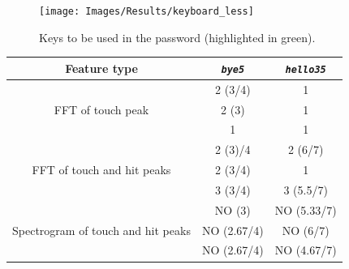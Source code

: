\begin{figure}[h]
     \centering
	 \texttt{[image: Images/Results/keyboard\_less]}
     \caption{\footnotesize{Keys to be used in the password (highlighted in green).}}\label{Results:keyboard}
\end{figure}
\begin{table}[h]
\centering\footnotesize
\begin{tabular}{ccc}
\hline
{\textbf{Feature type}}&{\texttt{\textit{bye5}}}&{\texttt{\textit{hello35}}}\\
\hline
\multirow{3}{*}{FFT of touch peak} & {2 (3/4)} & {1}\\
& {2 (3)} & {1}\\
& {1} & {1}\\
\hline
\multirow{3}{*}{FFT of touch and hit peaks} & {2 (3)/4} & {2 (6/7)}\\
& {2 (3/4)} & {1}\\
& {3 (3/4)} & {3 (5.5/7)}\\
\hline
\multirow{3}{*}{Spectrogram of touch and hit peaks} & {NO (3)} & {NO (5.33/7)}\\
& {NO (2.67/4)} & {NO (6/7)}\\
& {NO (2.67/4)} & {NO (4.67/7)}\\
\hline
\end{tabular}
\end{table}

